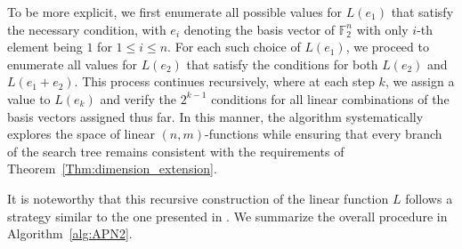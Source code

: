 \documentclass{amsart}[11pt]
\theoremstyle{plain}
\theoremstyle{definition}
\numberwithin{theorem}{section}
\numberwithin{equation}{section}
\numberwithin{table}{section}
\numberwithin{figure}{section}
\numberwithin{algorithm}{section}
\def\F{\mathbb F}
\begin{document}
To be more explicit, we first enumerate all possible values for $L(e_1)$ that satisfy the necessary condition, with $e_i$ denoting the basis vector of $\F_2^n$ with only $i$-th element being $1$ for $1 \le i \le n$.
For each such choice of $L(e_1)$, we proceed to enumerate all values for $L(e_2)$ that satisfy the conditions for both $L(e_2)$ and $L(e_1 + e_2)$.
This process continues recursively, where at each step $k$, we assign a value to $L(e_k)$ and verify the $2^{k-1}$ conditions for all linear combinations of the basis vectors assigned thus far.
In this manner, the algorithm systematically explores the space of linear $(n,m)$-functions while ensuring that every branch of the search tree remains consistent with the requirements of Theorem~\ref{Thm:dimension_extension}.

It is noteworthy that this recursive construction of the linear function $L$ follows a strategy similar to the one presented in \cite{DBLP:journals/dcc/BeierleLP22}.
We summarize the overall procedure in Algorithm~\ref{alg:APN2}.
\end{document}
